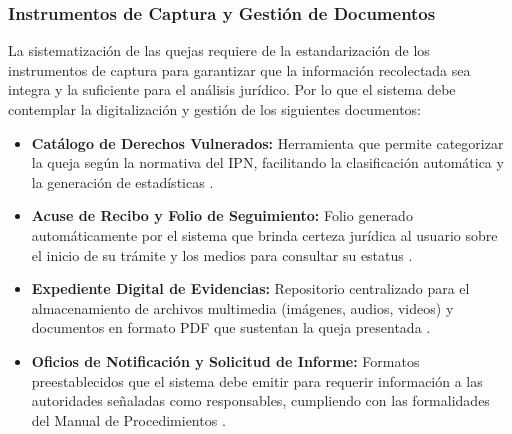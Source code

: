 \documentclass[12pt, letterpaper]{article}
\begin{document}
\subsubsection{Instrumentos de Captura y Gestión de Documentos}
La sistematización de las quejas requiere de la estandarización de los instrumentos de captura para garantizar que la información recolectada sea integra y la suficiente para el análisis jurídico. Por lo que el sistema debe contemplar la digitalización y gestión de los siguientes documentos:
\\
\begin{itemize}
    \item \textbf{Catálogo de Derechos Vulnerados:} Herramienta que permite categorizar la queja según la normativa del IPN, facilitando la clasificación automática y la generación de estadísticas \cite{ipn_manual_procedimientos}.
    \item \textbf{Acuse de Recibo y Folio de Seguimiento:} Folio generado automáticamente por el sistema que brinda certeza jurídica al usuario sobre el inicio de su trámite y los medios para consultar su estatus \cite{ipn_manual_procedimientos}.
    \item \textbf{Expediente Digital de Evidencias:} Repositorio centralizado para el almacenamiento de archivos multimedia (imágenes, audios, videos) y documentos en formato PDF que sustentan la queja presentada \cite{ipn_manual_procedimientos}.
    \item \textbf{Oficios de Notificación y Solicitud de Informe:} Formatos preestablecidos que el sistema debe emitir para requerir información a las autoridades señaladas como responsables, cumpliendo con las formalidades del Manual de Procedimientos \cite{ipn_manual_procedimientos}.
\end{itemize}

\newpage
\printbibliography[heading=bibintoc, title={Referencias}]
\end{document}

